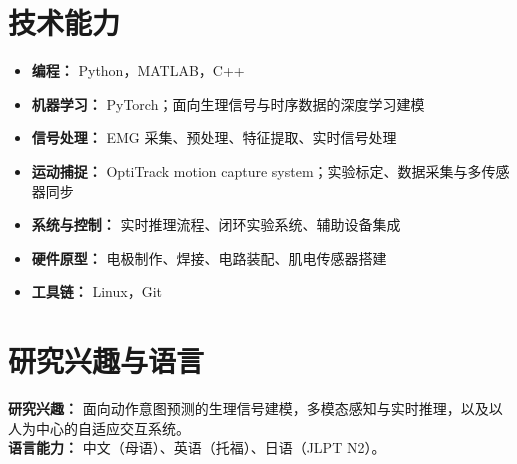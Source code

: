 \documentclass[10pt,letterpaper]{article}
\begin{document}
\section*{技术能力}
\begin{itemize}
  \item \textbf{编程：} Python，MATLAB，C++
  \item \textbf{机器学习：} PyTorch；面向生理信号与时序数据的深度学习建模
  \item \textbf{信号处理：} EMG 采集、预处理、特征提取、实时信号处理
  \item \textbf{运动捕捉：} OptiTrack motion capture system；实验标定、数据采集与多传感器同步
  \item \textbf{系统与控制：} 实时推理流程、闭环实验系统、辅助设备集成
  \item \textbf{硬件原型：} 电极制作、焊接、电路装配、肌电传感器搭建
  \item \textbf{工具链：} Linux，Git
\end{itemize}

\section*{研究兴趣与语言}
\textbf{研究兴趣：} 面向动作意图预测的生理信号建模，多模态感知与实时推理，以及以人为中心的自适应交互系统。\\
\textbf{语言能力：} 中文（母语）、英语（托福）、日语（JLPT N2）。
\end{document}
